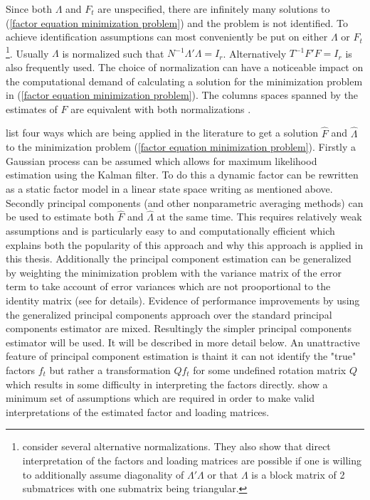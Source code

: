 \documentclass[11pt]{article}
\begin{document}
Since both $\Lambda$ and $F_t$ are unspecified, there are infinitely many solutions to (\ref{factor equation minimization problem}) and the problem is not identified. To achieve identification assumptions can most conveniently be put on either $\Lambda$ or $F_t$\footnote{\citet{bai2013principal} consider several alternative normalizations. They also show that direct interpretation of the factors and loading matrices are possible if one is willing to additionally assume diagonality of $\Lambda'\Lambda$ or that $\Lambda$ is a block matrix of 2 submatrices with one submatrix being triangular.}. Usually $\Lambda$ is normalized such that $N^{-1} \Lambda'\Lambda = I_r$. Alternatively $T^{-1}F'F = I_r$ is also frequently used. The choice of normalization can have a noticeable impact on the computational demand of calculating a solution for the minimization problem in (\ref{factor equation minimization problem}). The columns spaces spanned by the estimates of $F$ are equivalent with both normalizations \citep{stock2011dynamic}.

\citet{stock2011dynamic} list four ways which are being applied in the literature to get a solution $\hat F$ and $\hat \Lambda$ to the minimization problem (\ref{factor equation minimization problem}). Firstly a Gaussian process can be assumed which allows for maximum likelihood estimation using the Kalman filter. To do this a dynamic factor can be rewritten as a static factor model in a linear state space writing as mentioned above. \\
Secondly principal components (and other nonparametric averaging methods) can be used to estimate both $\hat F$ and $\hat \Lambda$ at the same time. This requires relatively weak assumptions and is particularly easy to and computationally efficient which explains both the popularity of this approach and why this approach is applied in this thesis. Additionally the principal component estimation can be generalized by weighting the minimization problem with the variance matrix of the error term to take account of error variances which are not prooportional to the identity matrix (see \citet{stock2011dynamic} for details). Evidence of performance improvements by using the generalized principal components approach over the standard principal components estimator are mixed. Resultingly the simpler principal components estimator will be used. It will be described in more detail below. An unattractive feature of principal component estimation is thaint it can not identify the "true" factors $f_t$ but rather a transformation $Q f_t$ for some undefined rotation matrix $Q$ which results in some difficulty in interpreting the factors directly. \citet{bai2013principal} show a minimum set of assumptions which are required in order to make valid interpretations of the estimated factor and loading matrices.
\end{document}
